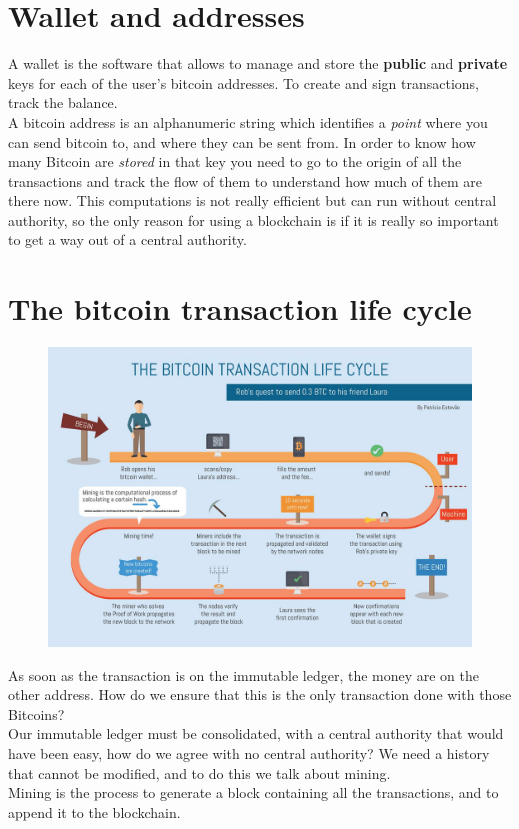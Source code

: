     \section{Wallet and addresses}
        A wallet is the software that allows to manage and store the \textbf{public} and \textbf{private} keys for each of the user's bitcoin addresses. To create and sign transactions, track the balance.\\
        A bitcoin address is an alphanumeric string which identifies a \textit{point} where you can send bitcoin to, and where they can be sent from.
        In order to know how many Bitcoin are \textit{stored} in that key you need to go to the origin of all the transactions and track the flow of them to understand how much of them are there now. This computations is not really efficient but can run without central authority, so the only reason for using a blockchain is if it is really so important to get a way out of a central authority.
    \section{The bitcoin transaction life cycle}
        \begin{figure}[ht!]
            \centering
            \includegraphics[width=0.6\linewidth]{lifecycle.png}
        \end{figure}
        As soon as the transaction is on the immutable ledger, the money are on the other address. How do we ensure that this is the only transaction done with those Bitcoins?\\
        Our immutable ledger must be consolidated, with a central authority that would have been easy, how do we agree with no central authority? We need a history that cannot be modified, and to do this we talk about mining.\\
        Mining is the process to generate a block containing all the transactions, and to append it to the blockchain.
